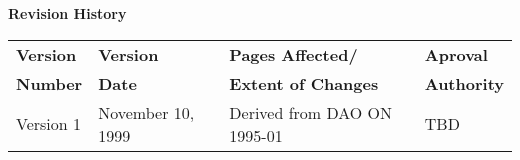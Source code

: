 % 
 \vspace*{\fill}
% 
 \centerline{\huge\bf Revision History}

% 
\bigskip
\bigskip
% 

\begin{center}
\begin{tabular}{|l|l|l|l|}\hline
{\bf Version} & {\bf Version} & {\bf Pages Affected/}   & {\bf Aproval}\\
{\bf Number}  & {\bf Date}    & {\bf Extent of Changes} & {\bf Authority}\\
\hline
\hline
Version 1 & November 10, 1999  & Derived from DAO ON 1995-01 & TBD\\
\hline
\end{tabular}
\end{center}
 \vspace*{\fill}
